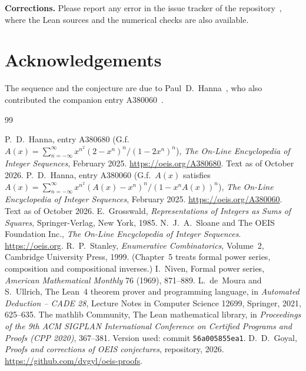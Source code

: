 \documentclass[11pt,a4paper]{article}
\theoremstyle{definition}
\theoremstyle{remark}
\newcommand{\para}[1]{\par\medskip\noindent\textbf{#1}\enspace}
\begin{document}
\para{Corrections.} Please report any error in the issue tracker of the repository~\cite{repo}, where the Lean sources and the numerical checks are also
available.

\section*{Acknowledgements}
The sequence and the conjecture are due to Paul~D.~Hanna~\cite{oeis}, who also contributed the companion entry
A380060~\cite{oeisother}.

\begin{thebibliography}{99}\small
\raggedright
{} P.~D.~Hanna, entry A380680 (G.f.\ $A(x)=\sum_{n=-\infty}^{\infty}x^{n^2}(2-x^n)^n/(1-2x^n)^n$), \emph{The On-Line Encyclopedia of Integer Sequences}, February 2025. \url{https://oeis.org/A380680}. Text as of October 2026.
 P.~D.~Hanna, entry A380060 (G.f.\ $A(x)$ satisfies $A(x)=\sum_{n=-\infty}^{\infty}x^{n^2}(A(x)-x^n)^n/(1-x^nA(x))^n$), \emph{The On-Line Encyclopedia of Integer Sequences}, February 2025. \url{https://oeis.org/A380060}. Text as of October 2026.
 E.~Grosswald, \emph{Representations of Integers as Sums of Squares}, Springer-Verlag, New York, 1985.
 N.~J.~A.~Sloane and The OEIS Foundation Inc., \emph{The On-Line Encyclopedia of Integer Sequences}. \url{https://oeis.org}.
 R.~P.~Stanley, \emph{Enumerative Combinatorics}, Volume~2, Cambridge University Press, 1999. (Chapter~5 treats formal power series, composition and compositional inverses.)
 I.~Niven, Formal power series, \emph{American Mathematical Monthly} 76 (1969), 871--889.
 L.~de~Moura and S.~Ullrich, The Lean~4 theorem prover and programming language, in \emph{Automated Deduction -- CADE 28}, Lecture Notes in Computer Science 12699, Springer, 2021, 625--635.
 The mathlib Community, The Lean mathematical library, in \emph{Proceedings of the 9th ACM SIGPLAN International Conference on Certified Programs and Proofs (CPP 2020)}, 367--381. Version used: commit \texttt{56a005855ea1}.
 D.~D.~Goyal, \emph{Proofs and corrections of OEIS conjectures}, repository, 2026. \url{https://github.com/dvgyl/oeis-proofs}.
\end{thebibliography}
\end{document}
